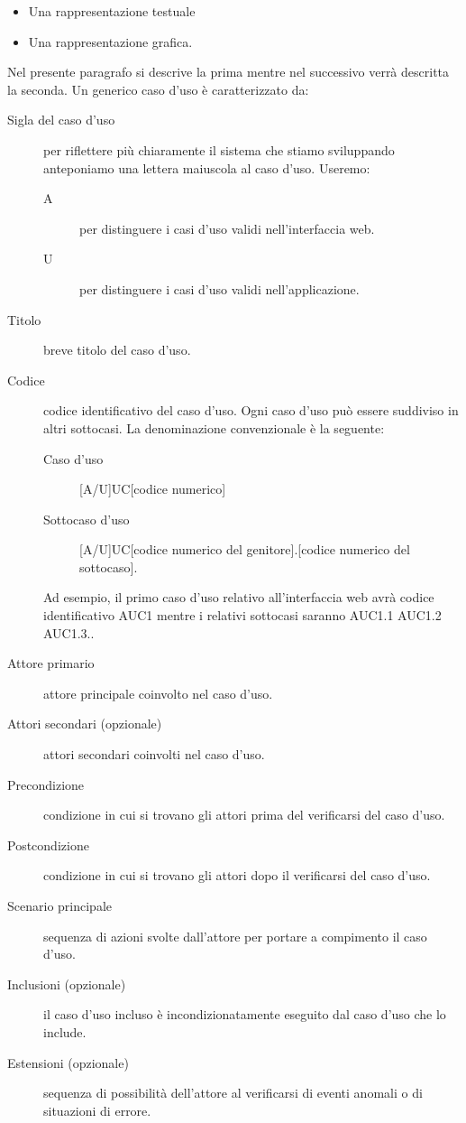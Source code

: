 \documentclass[../../norme-di-progetto.tex]{subfiles}
\begin{document}
\begin{itemize}
  \item Una rappresentazione testuale
  \item Una rappresentazione grafica.
\end{itemize}

Nel presente paragrafo si descrive la prima mentre nel successivo verrà descritta la seconda.
Un generico caso d'uso è caratterizzato da:
\begin{description}
  \item [Sigla del caso d'uso] per riflettere più chiaramente il sistema che stiamo sviluppando anteponiamo una lettera maiuscola al caso d'uso.
        Useremo:
        \begin{description}
          \item [A] per distinguere i casi d'uso validi nell'interfaccia web.
          \item [U] per distinguere i casi d'uso validi nell'applicazione.
        \end{description}
  \item [Titolo] breve titolo del caso d'uso.
  \item [Codice] codice identificativo del caso d'uso. Ogni caso d'uso può essere suddiviso in altri sottocasi. La denominazione convenzionale è la seguente:
        \begin{description}
          \item [Caso d'uso] [A/U]UC[codice numerico]
          \item [Sottocaso d'uso] [A/U]UC[codice numerico del genitore].[codice numerico del sottocaso].
        \end{description}
        Ad esempio, il primo caso d'uso relativo all'interfaccia web avrà codice identificativo AUC1 mentre i relativi sottocasi saranno AUC1.1 AUC1.2 AUC1.3..
  \item [Attore primario] attore principale coinvolto nel caso d'uso.
  \item [Attori secondari (opzionale)] attori secondari coinvolti nel caso d'uso.
  \item [Precondizione] condizione in cui si trovano gli attori prima del verificarsi del caso d'uso.
  \item [Postcondizione] condizione in cui si trovano gli attori dopo il verificarsi del caso d'uso.
  \item [Scenario principale] sequenza di azioni svolte dall'attore per portare a compimento il caso d'uso.
  \item [Inclusioni (opzionale)] il caso d'uso incluso è incondizionatamente eseguito dal caso d'uso che lo include.
  \item [Estensioni (opzionale)] sequenza di possibilità dell'attore al verificarsi di eventi anomali o di situazioni di errore.
\end{description}
\end{document}
